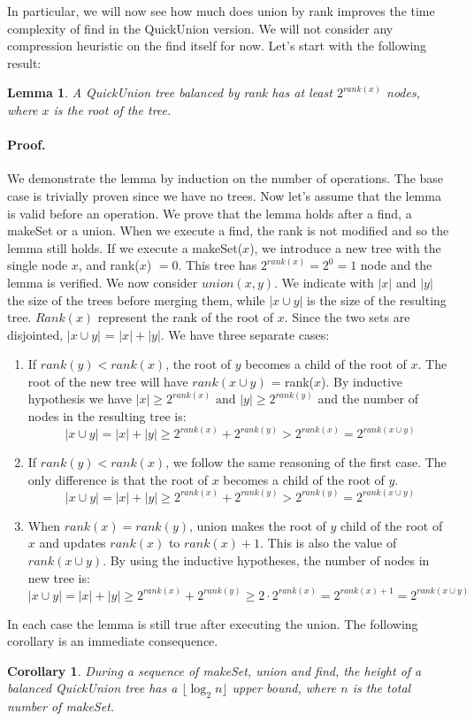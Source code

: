 \documentclass{article}
\newtheorem{lemma}{Lemma}
\newtheorem{corollary}{Corollary}
\begin{document}
In particular, we will now see
how much does union by rank improves the time complexity of find in the QuickUnion version.
We will not consider any compression heuristic on the find itself for now. 
Let's start with the following result:
\begin{lemma}\label{rank}
    A QuickUnion tree balanced by rank has at least $2^{rank(x)}$ nodes, where $x$ is the root of the tree.
\end{lemma}
\paragraph{\textbf{Proof.}} We demonstrate the lemma by induction on the number of operations. The base case is trivially proven
since we have no trees. Now let's assume that the lemma is valid before an operation. We  prove that the lemma holds after a find, a makeSet or a union. When we execute  a find, the rank is not modified and so the lemma still holds.
If we execute a makeSet($x$), we introduce a new tree with the single node $x$, and rank($x$) $ = 0$.
This tree has $2^{rank(x)} = 2^0 = 1$ node  and the lemma is verified. We now consider $union(x, y)$.
We indicate with $|x|$ and $|y|$ the size of the trees before merging them, while $|x \cup y|$ is the size of the resulting tree. $Rank(x)$ represent the rank 
of the root of $x$. Since the two sets are disjointed,
$|x \cup y|$ = $|x| + |y|$.
We have three separate cases:\begin{enumerate}
    \item If $rank(y) < rank(x)$, the root of $y$ becomes a child of the root of $x$. The root of the new tree will have $rank(x \cup y)$ = rank($x$). 
    By inductive hypothesis we have $|x| \geq 2^{rank(x)}\text{ and }|y| \geq 2^{rank(y)}$ and the number
    of nodes in the resulting tree is:
    $$ |x\cup y| = |x| + |y| \geq 2^{rank(x)} + 2^{rank(y)} > 2^{rank(x)} = 2^{rank(x \cup y)} $$
    \item If $rank(y) < rank(x)$, we follow the same reasoning of the first case. The only difference is that
    the root of $x$ becomes a child of the root of $y$.
    $$ |x\cup y| = |x| + |y| \geq 2^{rank(x)} + 2^{rank(y)} > 2^{rank(y)} = 2^{rank(x \cup y)} $$
    \item When $rank(x) = rank(y)$,  union makes the root of $y$ child of the root of $x$ and updates $rank(x)$ to $rank(x) + 1$. This is also the value of $rank(x\cup y)$.
    By using the inductive hypotheses, the number of nodes in new tree is:
    $$  |x\cup y| = |x| + |y| \geq 2^{rank(x)} + 2^{rank(y)} \geq 2\cdot2^{rank(x)} = 2^{rank(x) + 1} = 2^{rank(x \cup y)} $$
\end{enumerate}
In each case the lemma is still true after executing the union. The following corollary is an immediate consequence.
\begin{corollary}
    During a sequence of makeSet, union and find, the height of a balanced QuickUnion tree has a $\lfloor \log_2 n \rfloor$ upper bound, where $n$
    is the total number of makeSet.
\end{corollary}
\end{document}
